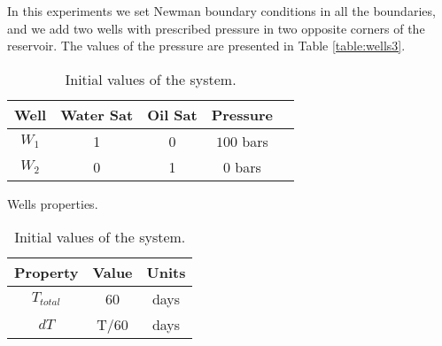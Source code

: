 \documentclass[12pt]{article}
\begin{document}
In this experiments we set Newman boundary conditions in all the boundaries, and we add two wells with prescribed pressure in two opposite corners of the reservoir. The values of the pressure are presented in Table \ref{table:wells3}.
\begin{table}[!ht]
\hspace{-0cm}
\begin{minipage}{.5\textwidth}
\centering
\begin{tabular}{ |c|c|c|c|c|} 
\hline
Well&Water Sat&Oil Sat&Pressure\\
\hline
$W_1$&     1&    0 & $100$ bars \\  
$W_2$& 0& 1& $0$ bars\\
\hline
\end{tabular}
\caption{Wells properties.}\label{table:wells4}
\end{minipage}%
\begin{minipage}{.4\textwidth}
\centering
\begin{tabular}{ |c|c|c|} 
\hline
Property&Value&Units\\
\hline
    $T_{total}$&     60& days\\
$dT$& T/60&days\\
\hline
\end{tabular}\caption{Initial values of the system.}
\label{table:icw}
\end{minipage}
\hspace{1cm} 
\end{table} 
\end{document}
